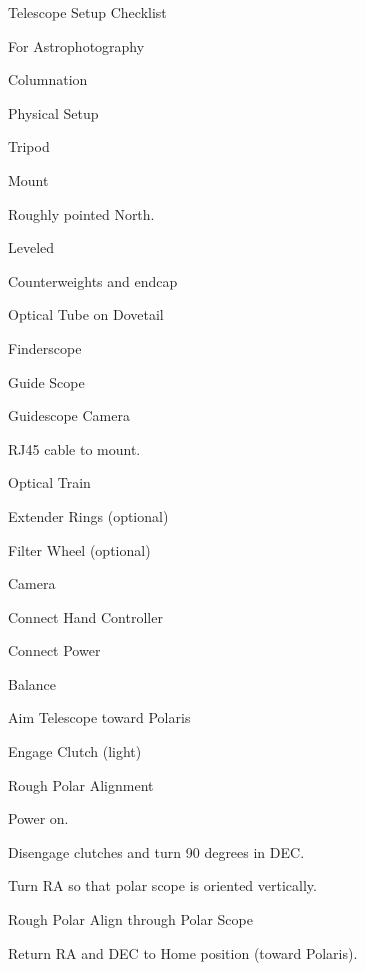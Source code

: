 \documentclass{article}
\begin{document}
	\begin{center}
			\huge {Telescope Setup Checklist}
			
			\Large For Astrophotography
	\end{center}
 
	\normalsize

	
	
	\begin{itemize}
		\item Columnation
		\item Physical Setup
		
			\item Counterweights and endcap
			\item Optical Tube on Dovetail
			\item Finderscope
			\item Guide Scope
			\item Optical Train
			\item Connect Hand Controller
			\item Connect Power
			\item Balance
			\item Aim Telescope toward Polaris
			\item Engage Clutch (light)
			\end{todolist}
		
		\item Rough Polar Alignment
			\begin{todolist}
			
			\item  Power on.
			\item Disengage clutches and turn 90 degrees in DEC.
			\item Turn RA so that polar scope is oriented vertically.  
			\item Rough Polar Align through Polar Scope
			\item Return RA and DEC to Home position (toward Polaris).
			
			
			
	
		\end{todolist}	
	\end{itemize}
\end{document}
